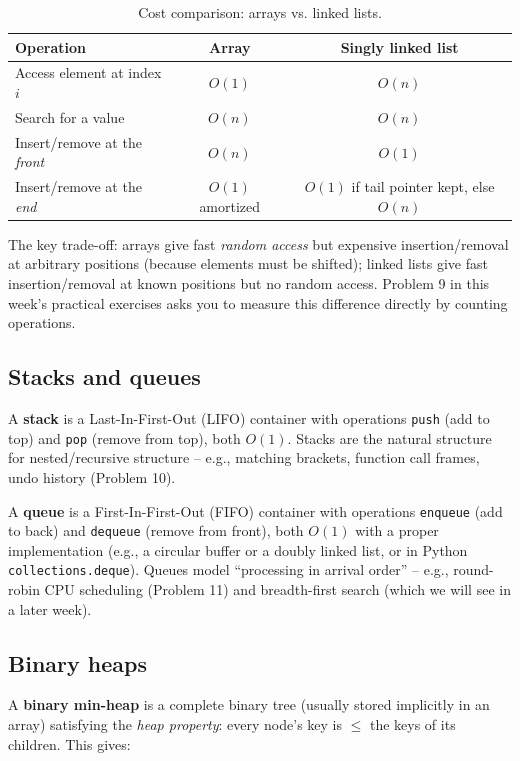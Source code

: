 \documentclass[11pt]{article}
\begin{document}
\begin{table}[h]
\centering
\begin{tabular}{@{}lcc@{}}
\toprule
Operation & Array & Singly linked list \\
\midrule
Access element at index $i$       & $O(1)$ & $O(n)$ \\
Search for a value                 & $O(n)$ & $O(n)$ \\
Insert/remove at the \emph{front}  & $O(n)$ & $O(1)$ \\
Insert/remove at the \emph{end}    & $O(1)$ amortized & $O(1)$ if tail pointer kept, else $O(n)$ \\
\bottomrule
\end{tabular}
\caption{Cost comparison: arrays vs. linked lists.}
\end{table}

The key trade-off: arrays give fast \emph{random access} but expensive insertion/removal
at arbitrary positions (because elements must be shifted); linked lists give fast
insertion/removal at known positions but no random access. Problem 9 in this week's
practical exercises asks you to measure this difference directly by counting operations.

\subsection{Stacks and queues}

A \textbf{stack} is a Last-In-First-Out (LIFO) container with operations
\texttt{push} (add to top) and \texttt{pop} (remove from top), both $O(1)$. Stacks are the
natural structure for nested/recursive structure -- e.g., matching brackets, function call
frames, undo history (Problem 10).

A \textbf{queue} is a First-In-First-Out (FIFO) container with operations
\texttt{enqueue} (add to back) and \texttt{dequeue} (remove from front), both $O(1)$ with a
proper implementation (e.g., a circular buffer or a doubly linked list, or in Python
\texttt{collections.deque}). Queues model ``processing in arrival order'' -- e.g.,
round-robin CPU scheduling (Problem 11) and breadth-first search (which we will see in a
later week).

\subsection{Binary heaps}

A \textbf{binary min-heap} is a complete binary tree (usually stored implicitly in an
array) satisfying the \emph{heap property}: every node's key is $\le$ the keys of its
children. This gives:
\end{document}
